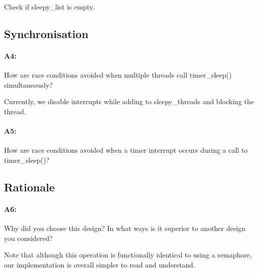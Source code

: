 \documentclass[11pt]{article}
\begin{document}
Check if sleepy\_list is empty.

\subsection{Synchronisation}
\paragraph{A4:}
How are race conditions avoided when multiple threads call timer\_sleep() simultaneously?

Currently, we disable interrupts while adding to sleepy\_threads and blocking the thread.

\paragraph{A5:}
How are race conditions avoided when a timer interrupt occurs during a call to timer\_sleep()?

\subsection{Rationale}
\paragraph{A6:}
Why did you choose this design? In what ways is it superior to another design you considered?

Note that although this operation is functionally identical to using a semaphore, our implementation is overall simpler to read and understand.
\end{document}
